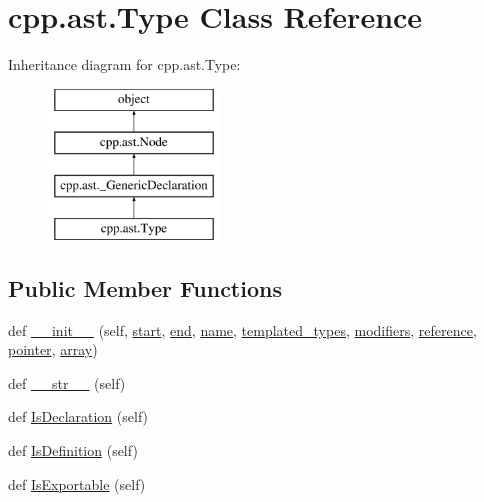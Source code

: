 \hypertarget{classcpp_1_1ast_1_1Type}{}\section{cpp.\+ast.\+Type Class Reference}
\label{classcpp_1_1ast_1_1Type}
Inheritance diagram for cpp.\+ast.\+Type\+:\begin{figure}[H]
\begin{center}
\leavevmode
\includegraphics[height=4.000000cm]{classcpp_1_1ast_1_1Type}
\end{center}
\end{figure}
\subsection*{Public Member Functions}
\begin{DoxyCompactItemize}
\item 
def \mbox{\hyperlink{classcpp_1_1ast_1_1Type_adc20d88db721b5d7b513c08a4d6753c9}{\+\_\+\+\_\+init\+\_\+\+\_\+}} (self, \mbox{\hyperlink{classcpp_1_1ast_1_1Node_a7b2aa97e6a049bb1a93aea48c48f1f44}{start}}, \mbox{\hyperlink{classcpp_1_1ast_1_1Node_a3c5e5246ccf619df28eca02e29d69647}{end}}, \mbox{\hyperlink{classcpp_1_1ast_1_1Type_a5905424e2b65f0215b6ecd73b4bfe24c}{name}}, \mbox{\hyperlink{classcpp_1_1ast_1_1Type_a7c38fcafa00dae6ee22bab783086a1a7}{templated\+\_\+types}}, \mbox{\hyperlink{classcpp_1_1ast_1_1Type_a0effa0a077eda79943e881955b4c51a5}{modifiers}}, \mbox{\hyperlink{classcpp_1_1ast_1_1Type_a8d2cddd631397c3bf86198cc420d584d}{reference}}, \mbox{\hyperlink{classcpp_1_1ast_1_1Type_a37234bb68915c93894cbc8e366c1eaad}{pointer}}, \mbox{\hyperlink{classcpp_1_1ast_1_1Type_a1fd0493e82da315bcb4c02b0cf2133a3}{array}})
\item 
def \mbox{\hyperlink{classcpp_1_1ast_1_1Type_a1a10eff21f6150b7e14bde3788fa069b}{\+\_\+\+\_\+str\+\_\+\+\_\+}} (self)
\item 
def \mbox{\hyperlink{classcpp_1_1ast_1_1Type_a590071a2bce7ea5140d7eb86c90f63bf}{Is\+Declaration}} (self)
\item 
def \mbox{\hyperlink{classcpp_1_1ast_1_1Type_aedff25dc3736e83388742e55fe29159b}{Is\+Definition}} (self)
\item 
def \mbox{\hyperlink{classcpp_1_1ast_1_1Type_a80dce781581c03e550ce51a9a33ca158}{Is\+Exportable}} (self)
\end{DoxyCompactItemize}
